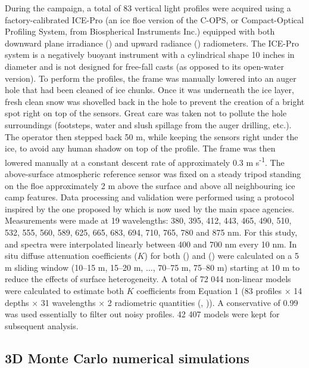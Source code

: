 During the campaign, a total of 83 vertical light profiles were acquired using a factory-calibrated ICE-Pro (an ice floe version of the C-OPS, or Compact-Optical Profiling System, from Biospherical Instruments Inc.) equipped with both downward plane irradiance \edz{} (\wmsquare{}) and upward radiance \luz{} (\wmsquaresr{}) radiometers. The ICE-Pro system is a negatively buoyant instrument with a cylindrical shape 10 inches in diameter and is not designed for free-fall casts (as opposed to its open-water version). To perform the profiles, the frame was manually lowered into an auger hole that had been cleaned of ice chunks. Once it was underneath the ice layer, fresh clean snow was shovelled back in the hole to prevent the creation of a bright spot right on top of the sensors. Great care was taken not to pollute the hole surroundings (footsteps, water and slush spillage from the auger drilling, etc.). The operator then stepped back 50 m, while keeping the sensors right under the ice, to avoid any human shadow on top of the profile. The frame was then lowered manually at a constant descent rate of approximately 0.3 m s\textsuperscript{-1}. The above-surface atmospheric reference sensor was fixed on a steady tripod standing on the floe approximately 2 m above the surface and above all neighbouring ice camp features. Data processing and validation were performed using a protocol inspired by the one proposed by \citet{Smith1984} which is now used by the main space agencies. Measurements were made at 19 wavelengths: 380, 395, 412, 443, 465, 490, 510, 532, 555, 560, 589, 625, 665, 683, 694, 710, 765, 780 and 875 nm. For this study, \ed{} and \lu{} spectra were interpolated linearly between 400 and 700 nm every 10 nm. In situ diffuse attenuation coefficients ($K$) for both \ed{} (\ked{}) and \lu{} (\klu{}) were calculated on a 5 m sliding window (10--15 m, 15--20 m, $\ldots$, 70--75 m, 75--80 m) starting at 10 m to reduce the effects of surface heterogeneity. A total of 72 044 non-linear models were calculated to estimate both $K$ coefficients from Equation 1 (83 profiles $\times$ 14 depths $\times$ 31 wavelengths $\times$ 2 radiometric quantities (\ed{}, \lu{})). A conservative \rsquared{} of 0.99 was used essentially to filter out noisy profiles. 42 407 models were kept for subsequent analysis.

\subsection{3D Monte Carlo numerical simulations}


